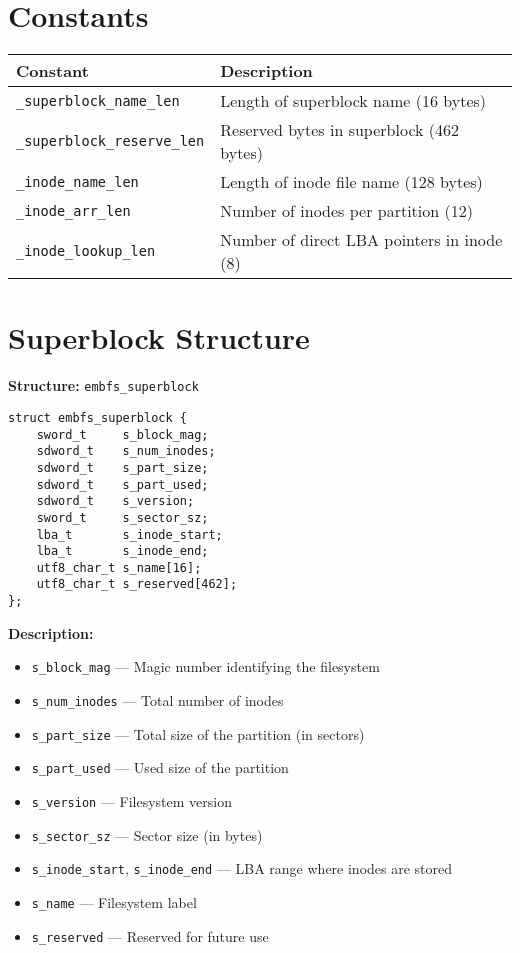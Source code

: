 \documentclass{article}
\begin{document}
\section{Constants}
\begin{longtable}{|l|l|}
\hline
\textbf{Constant} & \textbf{Description} \\
\hline
\texttt{\_superblock\_name\_len} & Length of superblock name (16 bytes) \\
\texttt{\_superblock\_reserve\_len} & Reserved bytes in superblock (462 bytes) \\
\texttt{\_inode\_name\_len} & Length of inode file name (128 bytes) \\
\texttt{\_inode\_arr\_len} & Number of inodes per partition (12) \\
\texttt{\_inode\_lookup\_len} & Number of direct LBA pointers in inode (8) \\
\hline
\end{longtable}

\section{Superblock Structure}
\textbf{Structure:} \texttt{embfs\_superblock}
\begin{lstlisting}
struct embfs_superblock {
    sword_t     s_block_mag;
    sdword_t    s_num_inodes;
    sdword_t    s_part_size;
    sdword_t    s_part_used;
    sdword_t    s_version;
    sword_t     s_sector_sz;
    lba_t       s_inode_start;
    lba_t       s_inode_end;
    utf8_char_t s_name[16];
    utf8_char_t s_reserved[462];
};
\end{lstlisting}

\textbf{Description:}
\begin{itemize}
    \item \texttt{s\_block\_mag} — Magic number identifying the filesystem
    \item \texttt{s\_num\_inodes} — Total number of inodes
    \item \texttt{s\_part\_size} — Total size of the partition (in sectors)
    \item \texttt{s\_part\_used} — Used size of the partition
    \item \texttt{s\_version} — Filesystem version
    \item \texttt{s\_sector\_sz} — Sector size (in bytes)
    \item \texttt{s\_inode\_start}, \texttt{s\_inode\_end} — LBA range where inodes are stored
    \item \texttt{s\_name} — Filesystem label
    \item \texttt{s\_reserved} — Reserved for future use
\end{itemize}
\end{document}
